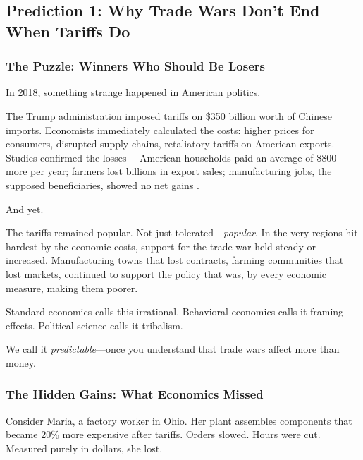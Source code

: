 \subsection{Prediction 1: Why Trade Wars Don't End When Tariffs Do}
\label{subsec:pred1-tradewar}


\subsubsection{The Puzzle: Winners Who Should Be Losers}

In 2018, something strange happened in American politics.

The Trump administration imposed tariffs on \$350 billion worth of Chinese imports. 
Economists immediately calculated the costs: higher prices for consumers, disrupted 
supply chains, retaliatory tariffs on American exports. Studies confirmed the losses---
American households paid an average of \$800 more per year; farmers lost billions 
in export sales; manufacturing jobs, the supposed beneficiaries, showed no net gains 
\citep{amiti2019impact, fajgelbaum2020return}.

And yet.

The tariffs remained popular. Not just tolerated---\emph{popular}. In the very 
regions hit hardest by the economic costs, support for the trade war held steady 
or increased. Manufacturing towns that lost contracts, farming communities that 
lost markets, continued to support the policy that was, by every economic measure, 
making them poorer.

Standard economics calls this irrational. Behavioral economics calls it framing effects. 
Political science calls it tribalism.

We call it \emph{predictable}---once you understand that trade wars affect more than money.

\subsubsection{The Hidden Gains: What Economics Missed}

Consider Maria, a factory worker in Ohio. Her plant assembles components that became 
20\% more expensive after tariffs. Orders slowed. Hours were cut. Measured purely 
in dollars, she lost.

